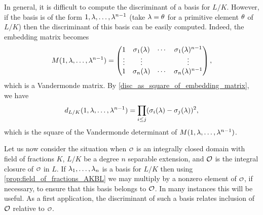     In general, it is difficult to compute the discriminant of a basis for \(L/K\). However, if the basis is of the form \(1,\lambda,\ldots,\lambda^{n-1}\) (take \(\lambda = \theta\) for a primitive element \(\theta\) of \(L/K\)) then the discriminant of this basis can be easily computed. Indeed, the embedding matrix becomes
    \[
      M(1,\lambda,\ldots,\lambda^{n-1}) = \begin{pmatrix} 1 & \sigma_{1}(\lambda) & \cdots & \sigma_{1}(\lambda)^{n-1} \\ \vdots & \vdots & & \vdots \\ 1 & \sigma_{n}(\lambda) & \cdots & \sigma_{n}(\lambda)^{n-1} \end{pmatrix},
    \]
    which is a Vandermonde matrix. By \cref{disc_as_square_of_embedding_matrix}, we have
    \begin{equation}\label{equ:Vandermonde_determinant_for_discriminant}
      d_{L/K}(1,\lambda,\ldots,\lambda^{n-1}) = \prod_{i \le j}(\sigma_{i}(\lambda)-\sigma_{j}(\lambda))^{2},
    \end{equation}
    which is the square of the Vandermonde determinant of \(M(1,\lambda,\ldots,\lambda^{n-1})\).

    Let us now consider the situation when \(\smc{O}\) is an integrally closed domain with field of fractions \(K\), \(L/K\) be a degree \(n\) separable extension, and \(\mathcal{O}\) is the integral closure of \(\smc{O}\) in \(L\). If \(\lambda_{1},\ldots,\lambda_{n}\) is a basis for \(L/K\) then using \cref{prop:field_of_fractions_AKBL} we may multiply by a nonzero element of \(\smc{O}\), if necessary, to ensure that this basis belongs to \(\mathcal{O}\). In many instances this will be useful. As a first application, the discriminant of such a basis relates inclusion of \(\mathcal{O}\) relative to \(\smc{O}\).

